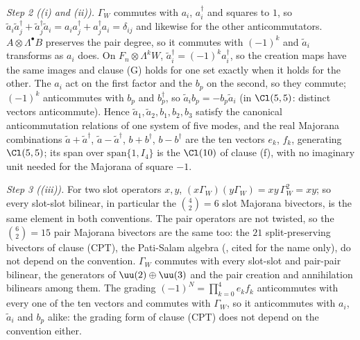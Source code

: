 \emph{Step 2 ((i) and (ii)).} $\Gamma_{W}$ commutes with $a_{i}$, $a_{i}^{\dagger}$ and squares to $1$, so $\tilde a_{i}\tilde a_{j}^{\dagger} + \tilde a_{j}^{\dagger}\tilde a_{i} = a_{i}a_{j}^{\dagger} + a_{j}^{\dagger}a_{i} = \delta_{ij}$ and likewise for the other anticommutators. $A \otimes \Lambda^{\bullet}B$ preserves the pair degree, so it commutes with $(-1)^{k}$ and $\tilde a_{i}$ transforms as $a_{i}$ does. On $F_{n} \otimes \Lambda^{k}W$, $\tilde a_{i}^{\dagger} = (-1)^{k}a_{i}^{\dagger}$, so the creation maps have the same images and clause (G) holds for one set exactly when it holds for the other. The $a_{i}$ act on the first factor and the $b_{p}$ on the second, so they commute; $(-1)^{k}$ anticommutes with $b_{p}$ and $b_{p}^{\dagger}$, so $\tilde a_{i}b_{p} = -b_{p}\tilde a_{i}$ (in $\Cl(5,5)$: distinct vectors anticommute). Hence $\tilde a_{1}, \tilde a_{2}, b_{1}, b_{2}, b_{3}$ satisfy the canonical anticommutation relations of one system of five modes, and the real Majorana combinations $\tilde a + \tilde a^{\dagger}$, $\tilde a - \tilde a^{\dagger}$, $b + b^{\dagger}$, $b - b^{\dagger}$ are the ten vectors $e_{k}$, $f_{k}$, generating $\Cl(5,5)$; its span over $\mathrm{span}\{1, I_{4}\}$ is the $\Cl(10)$ of clause (f), with no imaginary unit needed for the Majorana of square $-1$.

\emph{Step 3 ((iii)).} For two slot operators $x, y$, $(x\Gamma_{W})(y\Gamma_{W}) = xy\,\Gamma_{W}^{2} = xy$; so every slot-slot bilinear, in particular the $\binom{4}{2} = 6$ slot Majorana bivectors, is the same element in both conventions. The pair operators are not twisted, so the $\binom{6}{2} = 15$ pair Majorana bivectors are the same too: the $21$ split-preserving bivectors of clause (CPT), the Pati-Salam algebra (, cited for the name only), do not depend on the convention. $\Gamma_{W}$ commutes with every slot-slot and pair-pair bilinear, the generators of $\uu(2) \oplus \uu(3)$ and the pair creation and annihilation bilinears among them. The grading $(-1)^{N} = \prod_{k=0}^{4}e_{k}f_{k}$ anticommutes with every one of the ten vectors and commutes with $\Gamma_{W}$, so it anticommutes with $a_{i}$, $\tilde a_{i}$ and $b_{p}$ alike: the grading form of clause (CPT) does not depend on the convention either.

